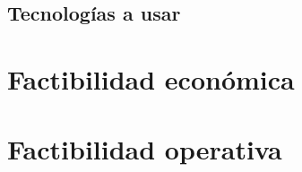 


\subsection*{Tecnologías a usar}











\section{Factibilidad económica}


\section{Factibilidad operativa}
